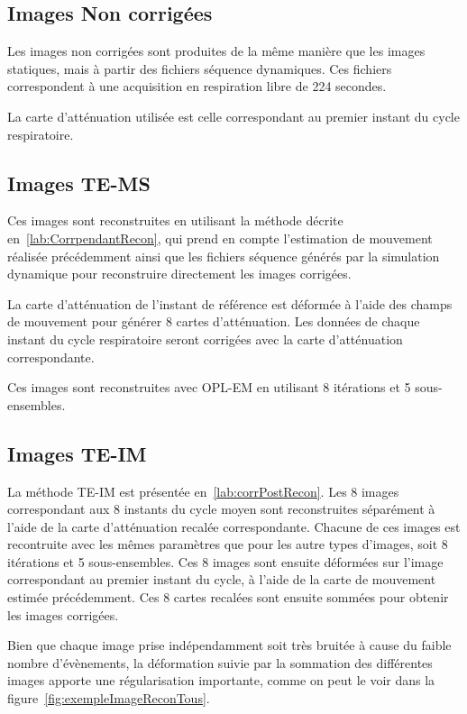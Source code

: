 \subsection{Images Non corrigées}

Les images non corrigées sont produites de la même manière que les images statiques, mais à partir des fichiers séquence dynamiques. Ces fichiers correspondent à une acquisition en respiration libre de 224 secondes. 

La carte d'atténuation utilisée est celle correspondant au premier instant du cycle respiratoire.

\subsection{Images TE-MS}

Ces images sont reconstruites en utilisant la méthode décrite en~\ref{lab:CorrpendantRecon}, qui prend en compte l'estimation de mouvement réalisée précédemment ainsi que les fichiers séquence générés par la simulation dynamique pour reconstruire directement les images corrigées. 

La carte d'atténuation de l'instant de référence est déformée à l'aide des champs de mouvement pour générer 8 cartes d'atténuation. Les données de chaque instant du cycle respiratoire seront corrigées avec la carte d'atténuation correspondante.

Ces images sont reconstruites avec OPL-EM en utilisant 8 itérations et 5 sous-ensembles.

\subsection{Images TE-IM}

La méthode TE-IM est présentée en~\ref{lab:corrPostRecon}. Les 8 images correspondant aux 8 instants du cycle moyen sont reconstruites séparément à l'aide de la carte d'atténuation recalée correspondante. Chacune de ces images est recontruite avec les mêmes paramètres que pour les autre types d'images, soit 8 itérations et 5 sous-ensembles. Ces 8 images sont ensuite déformées sur l'image correspondant au premier instant du cycle, à l'aide de la carte de mouvement estimée précédemment. Ces 8 cartes recalées sont ensuite sommées pour obtenir les images corrigées.

Bien que chaque image prise indépendamment soit très bruitée à cause du faible nombre d'évènements, la déformation suivie par la sommation des différentes images apporte une régularisation importante, comme on peut le voir dans la figure~\ref{fig:exempleImageReconTous}. 

